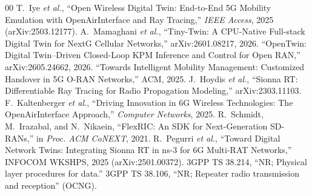 \documentclass[conference]{IEEEtran}
\begin{document}
\begin{thebibliography}{00}
 T.~Iye \emph{et al.}, ``Open Wireless Digital Twin: End-to-End 5G
Mobility Emulation with OpenAirInterface and Ray Tracing,'' \emph{IEEE Access},
2025 (arXiv:2503.12177).
 A.~Mamaghani \emph{et al.}, ``Tiny-Twin: A CPU-Native Full-stack
Digital Twin for NextG Cellular Networks,'' arXiv:2601.08217, 2026.
 ``OpenTwin: Digital Twin--Driven Closed-Loop KPM Inference and
Control for Open RAN,'' arXiv:2605.24662, 2026.
 ``Towards Intelligent Mobility Management: Customized Handover in 5G
O-RAN Networks,'' ACM, 2025.
 J.~Hoydis \emph{et al.}, ``Sionna RT: Differentiable Ray Tracing
for Radio Propagation Modeling,'' arXiv:2303.11103.
 F.~Kaltenberger \emph{et al.}, ``Driving Innovation in 6G Wireless
Technologies: The OpenAirInterface Approach,'' \emph{Computer Networks}, 2025.
 R.~Schmidt, M.~Irazabal, and N.~Nikaein, ``FlexRIC: An SDK for
Next-Generation SD-RANs,'' in \emph{Proc. ACM CoNEXT}, 2021.
 R.~Pegurri \emph{et al.}, ``Toward Digital Network Twins:
Integrating Sionna RT in ns-3 for 6G Multi-RAT Networks,'' INFOCOM WKSHPS, 2025
(arXiv:2501.00372).
 3GPP TS 38.214, ``NR; Physical layer procedures for data.''
 3GPP TS 38.106, ``NR; Repeater radio transmission and reception''
(OCNG).
\end{thebibliography}
\end{document}
